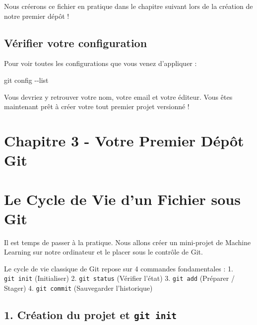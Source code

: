 \documentclass[
  letterpaper,
  DIV=11,
  numbers=noendperiod]{scrreprt}
\newenvironment{Shaded}{\begin{snugshade}}{\end{snugshade}}
\newcommand{\AttributeTok}[1]{\textcolor[rgb]{0.40,0.45,0.13}{#1}}
\newcommand{\FunctionTok}[1]{\textcolor[rgb]{0.28,0.35,0.67}{#1}}
\newcommand{\NormalTok}[1]{\textcolor[rgb]{0.00,0.23,0.31}{#1}}
\begin{document}
Nous créerons ce fichier en pratique dans le chapitre suivant lors de la
création de notre premier dépôt !

\subsection{Vérifier votre
configuration}\label{vuxe9rifier-votre-configuration}

Pour voir toutes les configurations que vous venez d'appliquer :

\begin{Shaded}
\begin{Highlighting}[]
\FunctionTok{git}\NormalTok{ config }\AttributeTok{{-}{-}list}
\end{Highlighting}
\end{Shaded}

Vous devriez y retrouver votre nom, votre email et votre éditeur. Vous
êtes maintenant prêt à créer votre tout premier projet versionné !


\section{Chapitre 3 - Votre Premier Dépôt
Git}\label{chapitre-3---votre-premier-duxe9puxf4t-git}


\section{Le Cycle de Vie d'un Fichier sous
Git}\label{le-cycle-de-vie-dun-fichier-sous-git}

Il est temps de passer à la pratique. Nous allons créer un mini-projet
de Machine Learning sur notre ordinateur et le placer sous le contrôle
de Git.

Le cycle de vie classique de Git repose sur 4 commandes fondamentales :
1. \texttt{git\ init} (Initialiser) 2. \texttt{git\ status} (Vérifier
l'état) 3. \texttt{git\ add} (Préparer / Stager) 4. \texttt{git\ commit}
(Sauvegarder l'historique)

\subsection{\texorpdfstring{1. Création du projet et
\texttt{git\ init}}{1. Création du projet et git init}}\label{cruxe9ation-du-projet-et-git-init}
\end{document}
